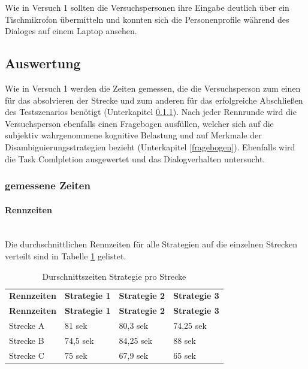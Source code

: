 \documentclass[12pt,a4paper]{scrartcl}
\begin{document}
Wie in Versuch 1 sollten die Versuchspersonen ihre Eingabe deutlich über ein Tischmikrofon übermitteln und konnten sich die Personenprofile während des Dialoges auf einem Laptop ansehen.



\subsection{Auswertung}
Wie in Versuch 1 werden die Zeiten gemessen, die die Versuchsperson zum einen für das absolvieren der Strecke und zum anderen für das erfolgreiche Abschließen des Testszenarios benötigt (Unterkapitel \ref{messwerte}).
Nach jeder Rennrunde wird die Versuchsperson ebenfalls einen Fragebogen ausfüllen, welcher sich auf die subjektiv wahrgenommene kognitive Belastung und auf Merkmale der Disambiguierungsstrategien bezieht (Unterkapitel \ref{fragebogen}). Ebenfalls wird die Task Comlpletion ausgewertet und das Dialogverhalten untersucht. 
\subsubsection{gemessene Zeiten}
\label{messwerte}
\paragraph{Rennzeiten} 
~\\

Die durchschnittlichen Rennzeiten für alle Strategien auf die einzelnen Strecken verteilt sind in Tabelle \ref{RZ3SV2} gelistet. 
\begin{longtable}{p{3cm}p{3cm}p{3cm}p{3cm} }
	\label{RZ3SV2}\\
	\caption[Durschnittszeiten Strategie pro Strecke]{Durschnittszeiten Strategie pro Strecke}\\
	\hline
	\textbf{Rennzeiten}&\textbf{Strategie 1}&\textbf{Strategie 2} &\textbf{Strategie 3}\\
	\hline
	\endfirsthead
	\hline
	\textbf{Rennzeiten}&\textbf{Strategie 1}&\textbf{Strategie 2} &\textbf{Strategie 3}\\
	\hline
	\endhead
Strecke A & 81 sek & 80,3 sek & 74,25 sek \\
Strecke B & 74,5 sek & 84,25 sek & 88 sek \\
Strecke C & 75 sek & 67,9 sek & 65 sek \\
\hline
\end{longtable}
\end{document}
